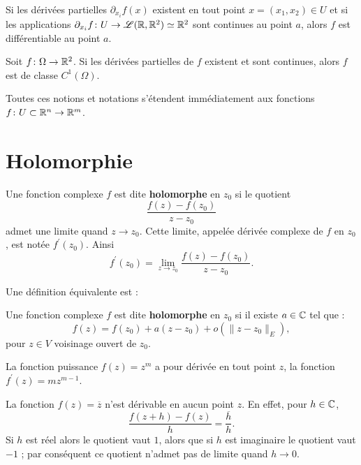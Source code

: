 \begin{fprop} Si les dérivées partielles $\partial_{x_i} f(x)$ existent en tout point $x=(x_1,x_2) \in U$ et
   si les applications $\partial_{x_i}f \colon U \to \mathcal{L}(\mathbb R, \mathbb R^2) \simeq \mathbb R^2$ sont continues au point $a$,
    alors $f$ est différentiable au point $a$.
\end{fprop}

\begin{fprop}
Soit $f \colon \Omega \to \mathbb R^2$. Si les dérivées partielles de $f$ existent et sont continues, alors $f$ est de classe $C^1(\Omega)$.
\end{fprop}


Toutes ces notions et notations s'étendent immédiatement aux fonctions $f \colon U \subset \mathbb R^n \to \mathbb R^m$. 



\section{Holomorphie}
\begin{fdefn}
Une fonction complexe $f$ est dite \textbf{holomorphe} en $z_0$ si le quotient
\[\frac{f(z) - f(z_0)}{z - z_0}\]
admet une limite quand $z \rightarrow z_0$. Cette limite, appelée dérivée complexe de $f$ en $z_0$, est notée $f^\prime(z_0)$. Ainsi
\[f^\prime(z_0) = \lim_{z \rightarrow z_0}\frac{f(z) - f(z_0)}{z - z_0}.\]  
\end{fdefn}

Une définition équivalente est :
\begin{fdefn}
Une fonction complexe $f$ est dite \textbf{holomorphe} en $z_0$ si il existe $a \in \mathbb{C}$ tel que :
\[f(z)=f(z_0) + a(z-z_0) + o(\|z-z_0\|_E),\] pour $z \in V$ voisinage ouvert de $z_0$.
\end{fdefn}



\begin{exem}
La fonction puissance $f(z)=z^m$ a pour dérivée en tout point $z$, la fonction $f^\prime (z)=m z^{m-1}$. \end{exem}
\begin{exem}
 La fonction $f(z)=\overline{z}$ n'est dérivable en aucun point $z$. En effet, pour $h \in \mathbb{C}$,
\[\frac{f(z + h) - f(z)}{h}= \frac{\overline{h}}{h}.\]
Si $h$ est réel alors le quotient vaut $1$, alors que si $h$ est imaginaire le quotient vaut $-1$ ; par conséquent ce quotient n'admet pas de limite quand $h \rightarrow 0$. 
\end{exem}

